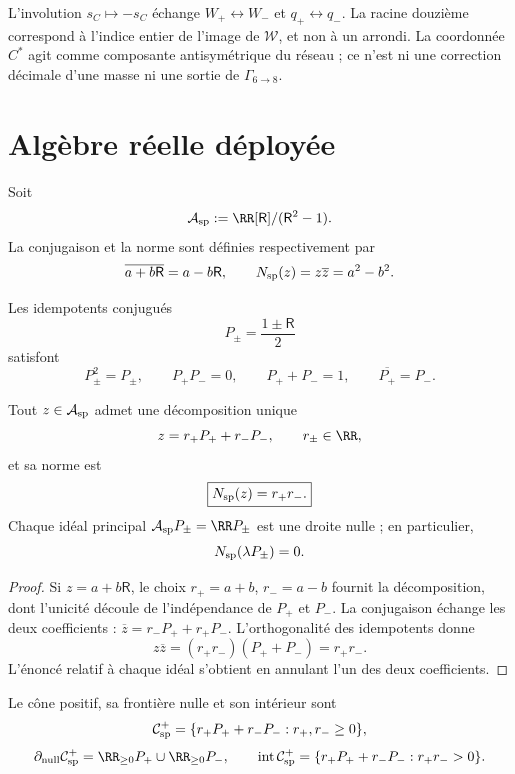 L'involution \(s_C\mapsto-s_C\) échange \(W_+\leftrightarrow W_-\) et \(q_+\leftrightarrow q_-\). La racine douzième correspond à l'indice entier de l'image de \(\mathcal W\), et non à un arrondi. La coordonnée \(C^*\) agit comme composante antisymétrique du réseau ; ce n'est ni une correction décimale d'une masse ni une sortie de \(\Gamma_{6\to8}\).

\section{Algèbre réelle déployée}
\label{sec:algebra-real-partida}

\begin{definition}
Soit
\[
 \mathcal A_{\rm sp}
 :=\RR[\mathsf R]/(\mathsf R^2-1).
\]
La conjugaison et la norme sont définies respectivement par
\[
 \overline{a+b\mathsf R}=a-b\mathsf R,
 \qquad
 N_{\rm sp}(z)=z\overline z=a^2-b^2.
\]
\end{definition}

Les idempotents conjugués
\[
 P_\pm=\frac{1\pm\mathsf R}{2}
\]
satisfont
\[
 P_\pm^2=P_\pm,\qquad
 P_+P_-=0,\qquad
 P_++P_-=1,\qquad
 \overline{P_+}=P_-.
\]

\begin{proposition}
\label{prop:descomposicion-espectral-partida} Tout \(z\in\mathcal A_{\rm sp}\) admet une décomposition unique
\[
 z=r_+P_++r_-P_-,
 \qquad r_\pm\in\RR,
\]
et sa norme est
\[
 \boxed{N_{\rm sp}(z)=r_+r_-.}
\]
Chaque idéal principal \(\mathcal A_{\rm sp}P_\pm=\RR P_\pm\) est une droite nulle ; en particulier,
\[
 N_{\rm sp}(\lambda P_\pm)=0.
\]
\end{proposition}

\begin{proof}
Si \(z=a+b\mathsf R\), le choix \(r_+=a+b\), \(r_-=a-b\) fournit la décomposition, dont l'unicité découle de l'indépendance de \(P_+\) et \(P_-\). La conjugaison échange les deux coefficients : \(\overline z=r_-P_++r_+P_-\). L'orthogonalité des idempotents donne
\[
 z\overline z=(r_+r_-)(P_++P_-)=r_+r_-.
\]
L'énoncé relatif à chaque idéal s'obtient en annulant l'un des deux coefficients.
\end{proof}

\begin{definition}
\label{def:cono-causal-partido} Le cône positif, sa frontière nulle et son intérieur sont
\[
 \mathcal C_{\rm sp}^{+}
 =\{r_+P_++r_-P_-:r_+,r_-\geq0\},
\]
\[
 \partial_{\rm null}\mathcal C_{\rm sp}^{+}
 =\RR_{\geq0}P_+\cup\RR_{\geq0}P_-,
\qquad
 \operatorname{int}\mathcal C_{\rm sp}^{+}
 =\{r_+P_++r_-P_-:r_+r_->0\}.
\]
\end{definition}

